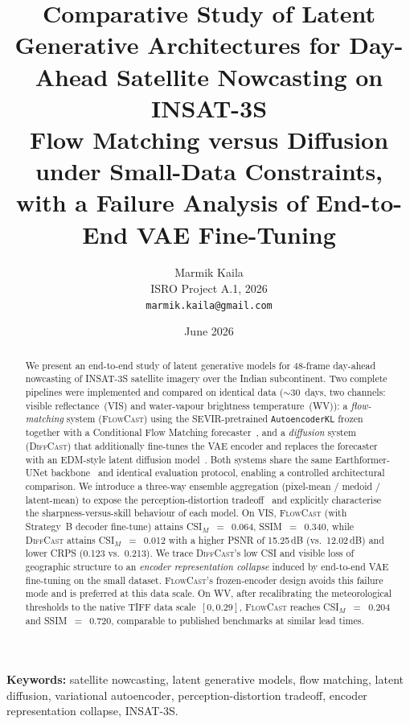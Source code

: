 \documentclass[11pt,a4paper]{article}
\title{\textbf{Comparative Study of Latent Generative Architectures for
       Day-Ahead Satellite Nowcasting on {INSAT-3S}}\\[0.5em]
       \large Flow Matching versus Diffusion under Small-Data Constraints,
       with a Failure Analysis of End-to-End {VAE} Fine-Tuning}
\author{Marmik Kaila\\[0.25em]
        ISRO Project A.1, 2026\\
        \texttt{marmik.kaila@gmail.com}}
\date{June 2026}
\begin{document}
\maketitle

\begin{abstract}
We present an end-to-end study of latent generative models for 48-frame
day-ahead nowcasting of {INSAT-3S} satellite imagery over the Indian
subcontinent. Two complete pipelines were implemented and compared on
identical data ($\sim$30~days, two channels: visible reflectance~(VIS) and
water-vapour brightness temperature~(WV)): a \emph{flow-matching} system
(\textsc{FlowCast}) using the {SEVIR}-pretrained \texttt{AutoencoderKL} frozen
together with a Conditional Flow Matching forecaster~\citep{flowcast2026,
lipman2023flowmatching}, and a \emph{diffusion} system (\textsc{DiffCast})
that additionally fine-tunes the {VAE} encoder and replaces the forecaster
with an {EDM}-style latent diffusion model~\citep{karras2022edm}. Both
systems share the same {Earthformer-UNet} backbone~\citep{gao2022earthformer}
and identical evaluation protocol, enabling a controlled architectural
comparison. We introduce a three-way ensemble aggregation
(pixel-mean / medoid / latent-mean) to expose the perception-distortion
tradeoff~\citep{blau2018perception} and explicitly characterise the
sharpness-versus-skill behaviour of each model. On VIS, \textsc{FlowCast}
(with Strategy~B decoder fine-tune) attains CSI$_M$~$=$~0.064,
SSIM~$=$~0.340, while \textsc{DiffCast} attains
CSI$_M$~$=$~0.012 with a higher PSNR of 15.25\,dB (vs.\ 12.02\,dB) and lower
CRPS (0.123 vs.\ 0.213). We trace \textsc{DiffCast}'s low CSI and visible
loss of geographic structure to an \emph{encoder representation collapse}
induced by end-to-end {VAE} fine-tuning on the small dataset.
\textsc{FlowCast}'s frozen-encoder design avoids this failure mode and is
preferred at this data scale. On WV, after recalibrating the meteorological
thresholds to the native {TIFF} data scale~$[0,0.29]$, \textsc{FlowCast}
reaches CSI$_M$~$=$~0.204 and SSIM~$=$~0.720, comparable to published
benchmarks at similar lead times.
\end{abstract}

\medskip
\noindent\textbf{Keywords:} satellite nowcasting, latent generative models,
flow matching, latent diffusion, variational autoencoder, perception-distortion
tradeoff, encoder representation collapse, {INSAT-3S}.

\end{document}
